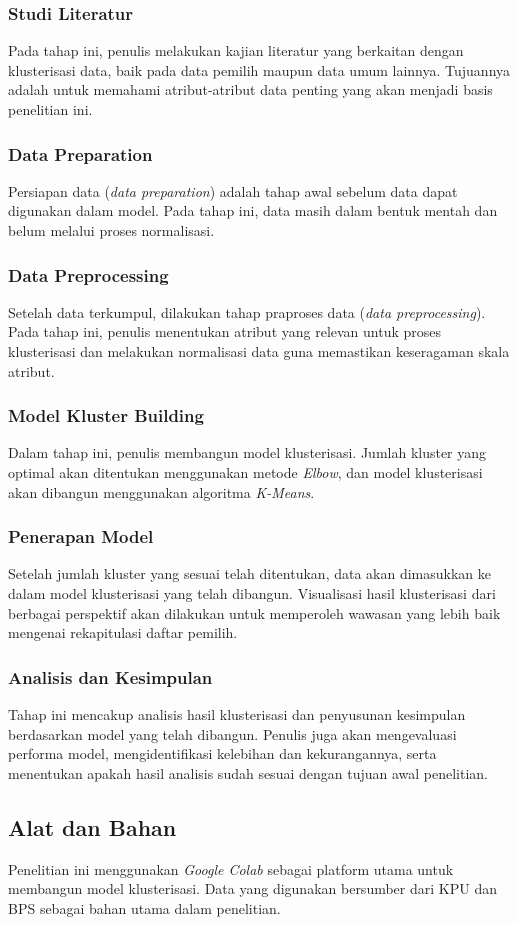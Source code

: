 \subsubsection{Studi Literatur}
Pada tahap ini, penulis melakukan kajian literatur yang berkaitan dengan klusterisasi data, baik pada data pemilih maupun data umum lainnya. Tujuannya adalah untuk memahami atribut-atribut data penting yang akan menjadi basis penelitian ini.

\subsubsection{Data Preparation}
Persiapan data (\textit{data preparation}) adalah tahap awal sebelum data dapat digunakan dalam model. Pada tahap ini, data masih dalam bentuk mentah dan belum melalui proses normalisasi.

\subsubsection{Data Preprocessing}
Setelah data terkumpul, dilakukan tahap praproses data (\textit{data preprocessing}). Pada tahap ini, penulis menentukan atribut yang relevan untuk proses klusterisasi dan melakukan normalisasi data guna memastikan keseragaman skala atribut.

\subsubsection{Model Kluster Building}
Dalam tahap ini, penulis membangun model klusterisasi. Jumlah kluster yang optimal akan ditentukan menggunakan metode \textit{Elbow}, dan model klusterisasi akan dibangun menggunakan algoritma \textit{K-Means}.

\subsubsection{Penerapan Model}
Setelah jumlah kluster yang sesuai telah ditentukan, data akan dimasukkan ke dalam model klusterisasi yang telah dibangun. Visualisasi hasil klusterisasi dari berbagai perspektif akan dilakukan untuk memperoleh wawasan yang lebih baik mengenai rekapitulasi daftar pemilih.

\subsubsection{Analisis dan Kesimpulan}
Tahap ini mencakup analisis hasil klusterisasi dan penyusunan kesimpulan berdasarkan model yang telah dibangun. Penulis juga akan mengevaluasi performa model, mengidentifikasi kelebihan dan kekurangannya, serta menentukan apakah hasil analisis sudah sesuai dengan tujuan awal penelitian.

\subsection{Alat dan Bahan}
Penelitian ini menggunakan \textit{Google Colab} sebagai platform utama untuk membangun model klusterisasi. Data yang digunakan bersumber dari KPU dan BPS sebagai bahan utama dalam penelitian.

\newpage